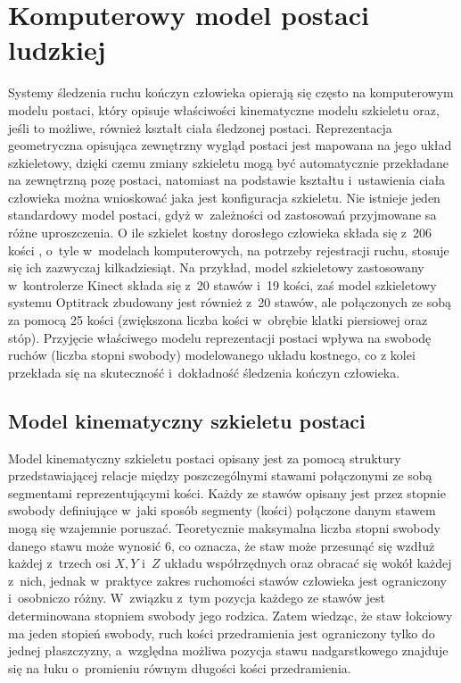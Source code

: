 \section{Komputerowy model postaci ludzkiej} \label{chap:bodyRep}
Systemy śledzenia ruchu kończyn człowieka opierają się często na komputerowym modelu postaci, który opisuje właściwości kinematyczne modelu szkieletu oraz, jeśli to możliwe, również kształt ciała śledzonej postaci. Reprezentacja geometryczna opisująca zewnętrzny wygląd postaci jest mapowana na jego układ szkieletowy, dzięki czemu zmiany szkieletu mogą być automatycznie przekładane na zewnętrzną pozę postaci, natomiast na podstawie kształtu i~ustawienia ciała człowieka można wnioskować jaka jest konfiguracja szkieletu. 
Nie istnieje jeden standardowy model postaci, gdyż w~zależności od zastosowań przyjmowane sa różne uproszczenia. O ile szkielet kostny dorosłego człowieka składa się z~206 kości \cite{Lasinski1990}, o~tyle w~modelach komputerowych, na potrzeby rejestracji ruchu, stosuje się ich zazwyczaj kilkadziesiąt. Na przykład, model szkieletowy zastosowany w~kontrolerze Kinect składa się z~20 stawów i~19 kości, zaś model szkieletowy systemu Optitrack zbudowany jest również z~20 stawów, ale połączonych ze sobą za pomocą 25 kości (zwiększona liczba kości w~obrębie klatki piersiowej oraz stóp). Przyjęcie właściwego modelu reprezentacji postaci wpływa na swobodę ruchów (liczba stopni swobody) modelowanego układu kostnego, co z kolei przekłada się na skuteczność i~dokładność śledzenia kończyn człowieka.
											
\subsection{Model kinematyczny szkieletu postaci}
Model kinematyczny szkieletu postaci opisany jest za pomocą struktury przedstawiającej relacje między poszczególnymi stawami połączonymi ze sobą segmentami reprezentującymi kości. Każdy ze stawów opisany jest przez stopnie swobody definiujące w~jaki sposób segmenty (kości) połączone danym stawem mogą się wzajemnie poruszać. Teoretycznie maksymalna liczba stopni swobody danego stawu może wynosić 6, co oznacza, że staw może przesunąć się wzdłuż każdej z~trzech osi $X, Y$ i~$Z$ układu współrzędnych oraz obracać się wokół każdej z~nich, jednak w~praktyce zakres ruchomości stawów człowieka jest ograniczony i~osobniczo różny. W~związku z~tym pozycja każdego ze stawów jest determinowana stopniem swobody jego rodzica. Zatem wiedząc, że staw łokciowy ma jeden stopień swobody, ruch kości przedramienia jest ograniczony tylko do jednej płaszczyzny, a~względna możliwa pozycja stawu nadgarstkowego znajduje się na łuku o~promieniu równym długości kości przedramienia.


